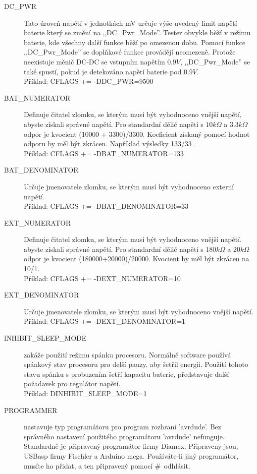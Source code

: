 \begin{description}
  \item[DC\_PWR] Tato úroveň napětí v jednotkách mV určuje výše uvedený limit napětí baterie
který se změní na ,,DC\_Pwr\_Mode''.
Tester obvykle běží v režimu baterie, kde všechny další funkce běží po omezenou dobu.
Pomocí funkce ,,DC\_Pwr\_Mode'' se doplňkové funkce provádějí neomezeně.
Protože neexistuje měnič DC-DC se vstupním napětím \(0.9V\),
,,DC\_Pwr\_Mode'' se také spustí, pokud je detekováno napětí baterie pod  \(0.9V\).\\
Příklad: CFLAGS += -DDC\_PWR=9500
 \item[BAT\_NUMERATOR] Definuje čitatel zlomku, se kterým musí být vyhodnoceno vnější napětí,
abyste získali správné napětí.
Pro standardní dělič napětí s \(10 k\Omega\) a \(3.3 k\Omega\) odpor je kvocient (10000 + 3300)/3300.
Koeficient získaný pomocí hodnot odporu by měl být zkrácen. Například výsledky 133/33 .\\
Příklad: CFLAGS += -DBAT\_NUMERATOR=133
 \item[BAT\_DENOMINATOR] Určuje jmenovatele zlomku, se kterým musí být vyhodnoceno externí napětí.\\
Příklad: CFLAGS += -DBAT\_DENOMINATOR=33
 \item[EXT\_NUMERATOR] Definuje čitatel zlomku, se kterým musí být vyhodnoceno vnější napětí.
abyste získali správné napětí. Pro standardní dělič napětí s \(180 k\Omega\) a \(20 k\Omega\) odpor
je kvocient (180000+20000)/20000.
Kvocient by měl být zkrácen na 10/1.\\
Příklad: CFLAGS += -DEXT\_NUMERATOR=10
 \item[EXT\_DENOMINATOR] Určuje jmenovatele zlomku, se kterým musí být vyhodnoceno vnější napětí.\\
Příklad: CFLAGS += -DEXT\_DENOMINATOR=1
  \item[INHIBIT\_SLEEP\_MODE] zakáže použití režimu spánku procesoru.
Normálně software používá spánkový stav procesoru pro delší pauzy, aby šetřil energii.
Použití tohoto stavu spánku s probuzením šetří kapacitu baterie,
představuje další požadavek pro regulátor napětí.\\
Příklad: DINHIBIT\_SLEEP\_MODE=1
  \item[PROGRAMMER] \label{PROGRAMMER} nastavuje typ programátoru pro program rozhraní 'avrdude'.
Bez správného nastavení použitého programátoru 'avrdude' nefunguje.
Standardně je připravený programátor firmy Diamex.
Připraveny jsou, USBasp firmy Fischler a Arduino mega.
Používáte-li jiný programátor, musíte ho přidat, a ten připravený pomocí \#~odhlásit.

\end{description}
